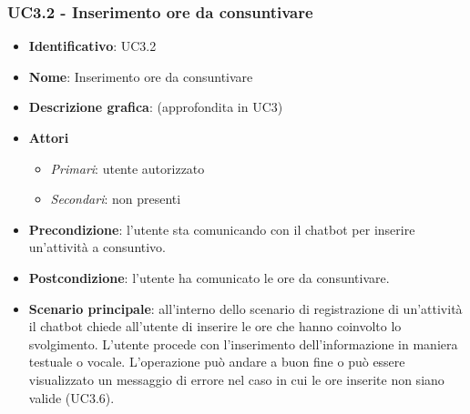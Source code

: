 \subsubsection{UC3.2 - Inserimento ore da consuntivare}
\begin{itemize}
    \item \textbf{Identificativo}: UC3.2 
    \item \textbf{Nome}: Inserimento ore da consuntivare  
    \item \textbf{Descrizione grafica}: (approfondita in UC3)
    \item \textbf{Attori}
        \begin{itemize} 
            \item \textit{Primari}: utente autorizzato
            \item \textit{Secondari}: non presenti
        \end{itemize}
    \item \textbf{Precondizione}: l'utente sta comunicando con il chatbot per inserire un'attività a consuntivo. 
    \item \textbf{Postcondizione}: l'utente ha comunicato le ore da consuntivare. 
    \item \textbf{Scenario principale}: all'interno dello scenario di registrazione di un'attività il chatbot chiede all'utente di inserire le ore che hanno coinvolto lo svolgimento. L'utente procede con l'inserimento dell'informazione in maniera testuale o vocale. L'operazione può andare a buon fine o può essere visualizzato un messaggio di errore nel caso in cui le ore inserite non siano valide (UC3.6).
\end{itemize}
\newpage

